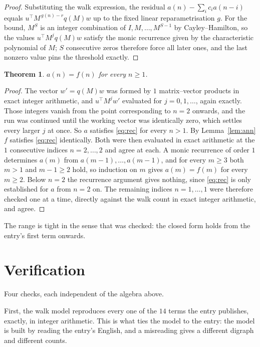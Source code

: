 \documentclass[11pt,a4paper]{article}
\theoremstyle{plain}
\newtheorem{theorem}{Theorem}
\theoremstyle{definition}
\begin{document}
\begin{proof}
Substituting the walk expression, the residual $a(n)-\sum_ic_ia(n-i)$ equals
$u^{\!\top}M^{\,g(n)-r}q(M)w$ up to the fixed linear reparametrisation $g$. For the bound,
$M^{S}$ is an integer combination of $I,M,\dots,M^{S-1}$ by Cayley--Hamilton, so the values
$u^{\!\top}M^{j}q(M)w$ satisfy the monic recurrence given by the characteristic polynomial of
$M$; $S$ consecutive zeros therefore force all later ones, and the last nonzero value pins the
threshold exactly.
\end{proof}

\begin{theorem}
$a(n)=f(n)$ for every $n\ge1$.
\end{theorem}

\begin{proof}
The vector $w'=q(M)w$ was formed by $1$ matrix--vector products in exact integer
arithmetic, and $u^{\!\top}M^{j}w'$ evaluated for $j=0,1,\dots$, again exactly. Those integers
vanish from the point corresponding to $n=2$ onwards, and the run was continued until the
working vector was identically zero, which settles every larger $j$ at once. So $a$ satisfies
\eqref{eq:rec} for every $n>1$. By Lemma~\ref{lem:ann} $f$ satisfies \eqref{eq:rec}
identically. Both were then evaluated in exact arithmetic at the $1$ consecutive indices
$n=2,\dots,2$ and agree at each. A monic recurrence of order $1$
determines $a(m)$ from $a(m-1),\dots,a(m-1)$, and for every $m\ge3$ both
$m>1$ and $m-1\ge2$ hold, so induction on $m$ gives $a(m)=f(m)$ for every
$m\ge2$.
Below $n=2$ the recurrence argument gives nothing, since \eqref{eq:rec} is only
established for $a$ from $n=2$ on. The remaining indices $n=1,\dots,1$ were
therefore checked one at a time, directly against the walk count in exact integer arithmetic,
and agree.
\end{proof}

The range is tight in the sense that was checked: the closed form holds from the entry's first term onwards.

\section{Verification}

Four checks, each independent of the algebra above.

First, the walk model reproduces every one of the $14$ terms the entry publishes,
exactly, in integer arithmetic. This is what ties the model to the entry: the model is built
by reading the entry's English, and a misreading gives a different digraph and different
counts.
\end{document}
